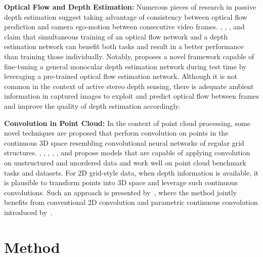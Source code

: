 \bigbreak\noindent\textbf{Optical Flow and Depth Estimation:} Numerous pieces of research in passive depth estimation suggest taking advantage of consistency between optical flow prediction and camera ego-motion between consecutive video frames. \cite{wang2019unos}, \cite{yin2018geonet}, \cite{zou2018df}, and \cite{ranjan2019competitive} claim that simultaneous training of an optical flow network and a depth estimation network can benefit both tasks and result in a better performance than training those individually. Notably, \cite{luo2020consistent} proposes a novel framework capable of fine-tuning a general monocular depth estimation network during test time by leveraging a pre-trained optical flow estimation network. Although it is not common in the context of active stereo depth sensing, there is adequate ambient information in captured images to exploit and predict optical flow between frames and improve the quality of depth estimation accordingly.

\bigbreak\noindent\textbf{Convolution in Point Cloud:} In the context of point cloud processing, some novel techniques are proposed that perform convolution on points in the continuous 3D space resembling convolutional neural networks of regular grid structures. \cite{thomas2019kpconv}, \cite{li2018pointcnn}, \cite{xu2018spidercnn}, \cite{wu2019pointconv}, \cite{boulch2020convpoint}, and \cite{wang2018deep} propose models that are capable of applying convolution on unstructured and unordered data and work well on point cloud benchmark tasks and datasets. For 2D grid-style data, when depth information is available, it is plausible to transform points into 3D space and leverage such continuous convolutions. Such an approach is presented by~\cite{chen2019learning}, where the method jointly benefits from conventional 2D convolution and parametric continuous convolution introduced by~\cite{wang2018deep}.

\section{Method}

